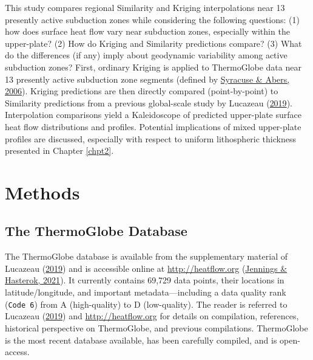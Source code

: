 This study compares regional Similarity and Kriging interpolations near 13 presently active subduction zones while considering the following questions: (1) how does surface heat flow vary near subduction zones, especially within the upper-plate? (2) How do Kriging and Similarity predictions compare? (3) What do the differences (if any) imply about geodynamic variability among active subduction zones? First, ordinary Kriging is applied to ThermoGlobe data near 13 presently active subduction zone segments (defined by \protect\hyperlink{ref-syracuse2006}{Syracuse \& Abers, 2006}). Kriging predictions are then directly compared (point-by-point) to Similarity predictions from a previous global-scale study by Lucazeau (\protect\hyperlink{ref-lucazeau2019}{2019}). Interpolation comparisons yield a Kaleidoscope of predicted upper-plate surface heat flow distributions and profiles. Potential implications of mixed upper-plate profiles are discussed, especially with respect to uniform lithospheric thickness presented in Chapter \ref{chpt2}.

\hypertarget{chpt3Methods}{%
\section{Methods}\label{chpt3Methods}}

\hypertarget{the-thermoglobe-database}{%
\subsection{The ThermoGlobe Database}\label{the-thermoglobe-database}}

The ThermoGlobe database is available from the supplementary material of Lucazeau (\protect\hyperlink{ref-lucazeau2019}{2019}) and is accessible online at \url{http://heatflow.org} (\protect\hyperlink{ref-jennings2021}{Jennings \& Hasterok, 2021}). It currently contains 69,729 data points, their locations in latitude/longitude, and important metadata---including a data quality rank (\texttt{Code\ 6}) from A (high-quality) to D (low-quality). The reader is referred to Lucazeau (\protect\hyperlink{ref-lucazeau2019}{2019}) and \url{http://heatflow.org} for details on compilation, references, historical perspective on ThermoGlobe, and previous compilations. ThermoGlobe is the most recent database available, has been carefully compiled, and is open-access.

